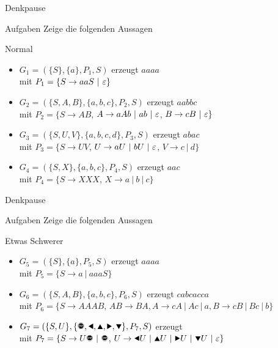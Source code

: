 {
\begin{frame}{Denkpause}
    \begin{alertblock}{Aufgaben}
        Zeige die folgenden Aussagen
    \end{alertblock}
    \begin{block}{Normal}
        \begin{itemize}
            \item $G_1=(\{S\}, \{a\}, P_1, S)$ erzeugt $aaaa$\\
            mit $P_1=\{S\rightarrow aaS\ |\ \emptyWord\}$
            \item $G_2=(\{S,A,B\}, \{a,b,c\}, P_2, S)$ erzeugt $aabbc$\\
            mit $P_2=\{S\rightarrow AB$, $A\rightarrow aAb \ |\ ab\ |\ \emptyWord$, $B\rightarrow cB \ |\  \emptyWord\}$ 
            \item $G_3=(\{S,U,V\}, \{a,b,c,d\}, P_3, S)$ erzeugt $abac$\\
            mit $P_3=\{S\rightarrow UV$, $U\rightarrow aU \ |\  bU \ |\  \emptyWord$, $V\rightarrow c \ |\  d\}$
            \item $G_4=(\{S,X\}, \{a,b,c\}, P_4, S)$ erzeugt $aac$\\
            mit $P_4=\{S\rightarrow XXX$, $X\rightarrow a \ |\  b \ |\  c\}$
        \end{itemize}
    \end{block}
\end{frame}
\begin{frame}{Denkpause}
    \begin{alertblock}{Aufgaben}
        Zeige die folgenden Aussagen
    \end{alertblock}
    \begin{block}{Etwas Schwerer}
        \begin{itemize}
            \item $G_5=(\{S\}, \{a\}, P_5, S)$ erzeugt $aaaa$\\
            mit $P_5=\{S\rightarrow a \ |\  aaaS\}$
            \item $G_6=(\{S,A,B\}, \{a,b,c\}, P_6, S)$ erzeugt $cabcacca$\\
            mit $P_6=\{S\rightarrow AAAB$, $AB\rightarrow BA,
                      A\rightarrow cA \ |\  Ac \ |\ a,
                      B\rightarrow cB \ |\  Bc \ |\  b\}$ 
            \item $G_7=(\{S,U\}, \{\text{\Stopsign},\text{\Rewind},\text{\MoveUp},\text{\Forward},\text{\MoveDown}\}, P_7, S)$  erzeugt \Forward\Stopsign\\
            mit $P_7=\{S\rightarrow U\text{\Stopsign} \ |\  \text{\Stopsign}$, $U\rightarrow \text{\Rewind} U \ |\  \text{\MoveUp} U \ |\  \text{\Forward} U \ |\  \text{\MoveDown} U \ |\ \emptyWord\}$
        \end{itemize}
    \end{block}
\end{frame}
}


